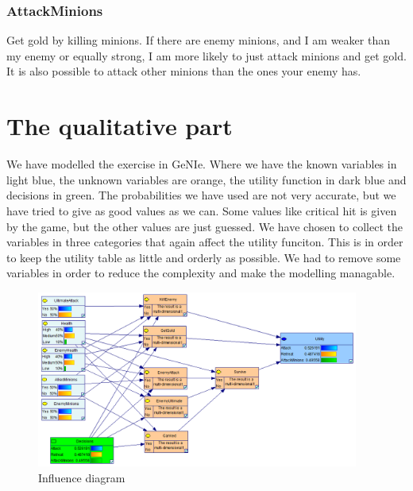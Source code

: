 \documentclass[titlepage]{article}
\begin{document}
\subsubsection*{AttackMinions}
Get gold by killing minions. If there are enemy minions, and I am weaker than my enemy or equally strong, I am more likely to just attack minions and get gold. It is also possible to attack other minions than the ones your enemy has. 




\newpage

\section{The qualitative part}
We have modelled the exercise in GeNIe. Where we have the known variables in light blue, the unknown variables are orange, the utility function in dark blue and decisions in green. The probabilities we have used are not very accurate, but we have tried to give as good values as we can. Some values like critical hit is given by the game, but the other values are just guessed. We have chosen to collect the variables in three categories that again affect the utility funciton. This is in order to keep the utility table as little and orderly as possible. We had to remove some variables in order to reduce the complexity and make the modelling managable.

\begin{figure}[H]
\label{fig:Influencediagram}
\includegraphics[width=400px]{InfluenceDiagram.PNG}
\caption{Influence diagram}
\end{figure}
\end{document}
